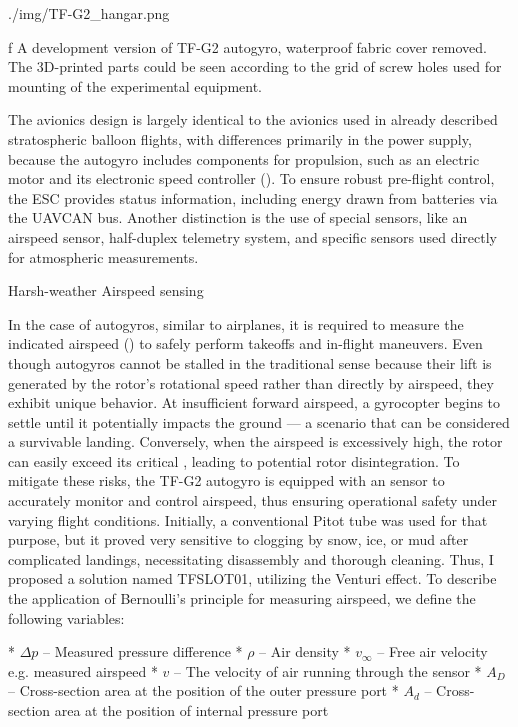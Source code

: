 \medskip
{}
\picw=15cm \cinspic ./img/TF-G2_hangar.png
\caption/f A development version of TF-G2 autogyro, waterproof fabric cover removed. The 3D-printed parts could be seen according to the grid of screw holes used for mounting of the experimental equipment.
\medskip

The avionics design is largely identical to the avionics used in already described stratospheric balloon flights, with differences primarily in the power supply, because the autogyro includes components for propulsion, such as an electric motor and its electronic speed controller (). To ensure robust pre-flight control, the ESC provides status information, including energy drawn from batteries via the UAVCAN bus. Another distinction is the use of special sensors, like an airspeed sensor, half-duplex telemetry system, and specific sensors used directly for atmospheric measurements.

\secc Harsh-weather Airspeed sensing

In the case of autogyros, similar to airplanes, it is required to measure the indicated airspeed () to safely perform takeoffs and in-flight maneuvers. Even though autogyros cannot be stalled in the traditional sense because their lift is generated by the rotor's rotational speed rather than directly by airspeed, they exhibit unique behavior. At insufficient forward airspeed, a gyrocopter begins to settle until it potentially impacts the ground — a scenario that can be considered a survivable landing. Conversely, when the airspeed is excessively high, the rotor can easily exceed its critical , leading to potential rotor disintegration. To mitigate these risks, the TF-G2 autogyro is equipped with an   sensor to accurately monitor and control airspeed, thus ensuring operational safety under varying flight conditions.
Initially, a conventional Pitot tube was used for that purpose, but it proved very sensitive to clogging by snow, ice, or mud after complicated landings, necessitating disassembly and thorough cleaning. Thus, I proposed a solution named TFSLOT01, utilizing the Venturi effect.  To describe the application of Bernoulli’s principle for measuring airspeed, we define the following variables:

\begitems
* $\Delta p$ -- Measured pressure difference
* $\rho$ -- Air density
* $v_\infty$ -- Free air velocity e.g. measured airspeed
* $v$ -- The velocity of air running through the sensor
* $A_D$ -- Cross-section area at the position of the outer pressure port
* $A_d$ -- Cross-section area at the position of internal pressure port
\enditems

